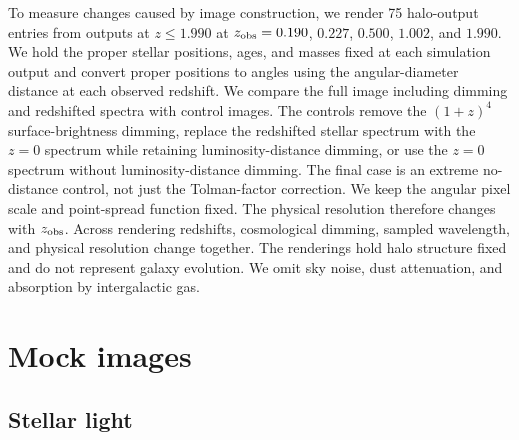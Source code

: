 \documentclass[usenatbib]{mnras}
\begin{document}
To measure changes caused by image construction, we render 75 halo-output
entries from outputs at $z\leq1.990$ at $z_{\rm obs}=0.190$, $0.227$, $0.500$, $1.002$, and $1.990$.
We hold the proper stellar positions, ages, and masses fixed at each
simulation output and convert proper positions to angles using the
angular-diameter distance at each observed redshift. We compare the full
image including dimming and redshifted spectra with control images. The
controls remove the $(1+z)^4$ surface-brightness
dimming, replace the redshifted stellar spectrum with the $z=0$ spectrum
while retaining luminosity-distance dimming, or use the $z=0$ spectrum
without luminosity-distance dimming. The final case is an extreme
no-distance control, not just the Tolman-factor correction. We keep the
angular pixel scale and point-spread function fixed. The physical
resolution therefore changes with $z_{\rm obs}$. Across rendering redshifts,
cosmological dimming, sampled wavelength, and physical resolution change
together. The renderings hold halo structure fixed and do not represent
galaxy evolution.
We omit sky noise, dust attenuation, and absorption by intergalactic gas.

\section{Mock images}
\label{sec:image}

\subsection{Stellar light}
\label{sec:light}
\end{document}
